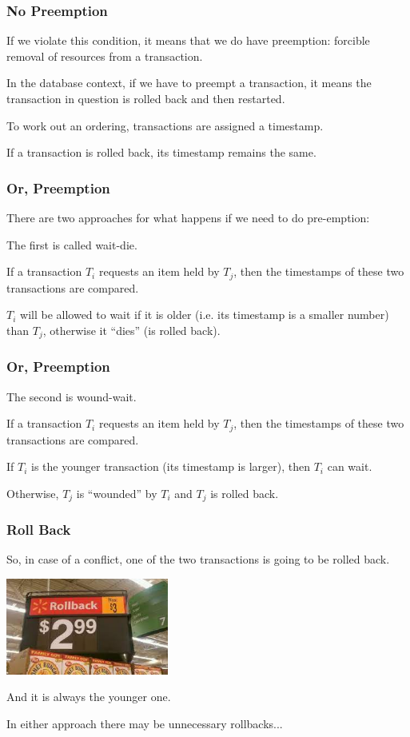 \begin{frame}
\frametitle{No Preemption}
If we violate this condition, it means that we do have preemption: forcible removal of resources from a transaction.

In the database context, if we have to preempt a transaction, it means the transaction in question is rolled back and then restarted. 

To work out an ordering, transactions are assigned a timestamp. 

If a transaction is rolled back, its timestamp remains the same.
\end{frame}


\begin{frame}
\frametitle{Or, Preemption}
There are two approaches for what happens if we need to do pre-emption:

The first is called \alert{wait-die}. 

If a transaction $T_{i}$ requests an item held by $T_{j}$, then the timestamps of these two transactions are compared. 

$T_{i}$ will be allowed to wait if it is older (i.e. its timestamp is a smaller number) than $T_{j}$, otherwise it ``dies'' (is rolled back). 


\end{frame}

\begin{frame}
\frametitle{Or, Preemption}

The second is \alert{wound-wait}. 

If a transaction $T_{i}$ requests an item held by $T_{j}$, then the timestamps of these two transactions are compared. 

If $T_{i}$ is the younger transaction (its timestamp is larger), then $T_{i}$ can wait. 

Otherwise, $T_{j}$ is ``wounded'' by $T_{i}$ and $T_{j}$ is rolled back.

\end{frame}

\begin{frame}
\frametitle{Roll Back}

So, in case of a conflict, one of the two transactions is going to be rolled back. 

\begin{center}
	\includegraphics[width=0.4\textwidth]{images/rollback.jpg}
\end{center}

And it is always the younger one. 

In either approach there may be unnecessary rollbacks...

\end{frame}

